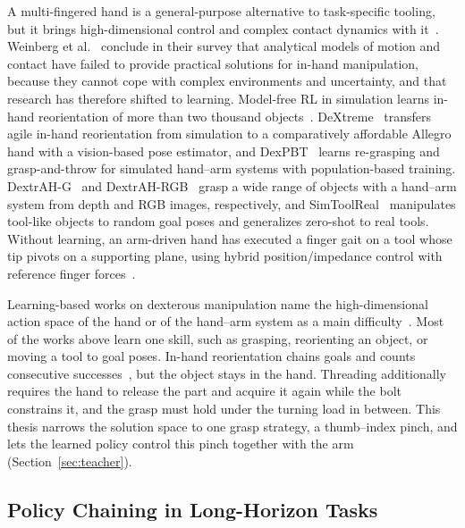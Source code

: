 A multi-fingered hand is a general-purpose alternative to task-specific tooling, but it brings high-dimensional control and complex contact dynamics with it~\cite{BicchiKumar2000,Weinberg2024}. Weinberg et al.~\cite{Weinberg2024} conclude in their survey that analytical models of motion and contact have failed to provide practical solutions for in-hand manipulation, because they cannot cope with complex environments and uncertainty, and that research has therefore shifted to learning. Model-free \ac{RL} in simulation learns in-hand reorientation of more than two thousand objects~\cite{Chen2021}. DeXtreme~\cite{Handa2024} transfers agile in-hand reorientation from simulation to a comparatively affordable Allegro hand with a vision-based pose estimator, and DexPBT~\cite{Petrenko2023} learns re-grasping and grasp-and-throw for simulated hand--arm systems with population-based training. DextrAH-G~\cite{Lum2024} and DextrAH-RGB~\cite{Singh2025} grasp a wide range of objects with a hand--arm system from depth and RGB images, respectively, and SimToolReal~\cite{Kedia2026} manipulates tool-like objects to random goal poses and generalizes zero-shot to real tools. Without learning, an arm-driven hand has executed a finger gait on a tool whose tip pivots on a supporting plane, using hybrid position/impedance control with reference finger forces~\cite{Xue2023}.

Learning-based works on dexterous manipulation name the high-dimensional action space of the hand or of the hand--arm system as a main difficulty~\cite{Chen2021,Lum2024,Chen2023}. Most of the works above learn one skill, such as grasping, reorienting an object, or moving a tool to goal poses. In-hand reorientation chains goals and counts consecutive successes~\cite{Handa2024}, but the object stays in the hand. Threading additionally requires the hand to release the part and acquire it again while the bolt constrains it, and the grasp must hold under the turning load in between. This thesis narrows the solution space to one grasp strategy, a thumb--index pinch, and lets the learned policy control this pinch together with the arm (Section~\ref{sec:teacher}).

\subsection{Policy Chaining in Long-Horizon Tasks}\label{sec:related-chaining}

